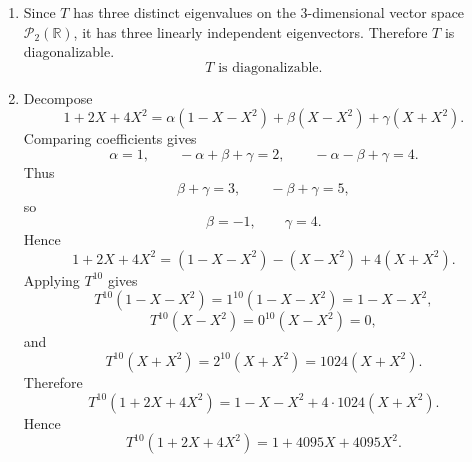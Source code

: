 \documentclass[12pt]{article}
\newcommand{\R}{\mathbb{R}}
\newcommand{\cP}{\mathcal{P}}
\begin{document}
\begin{enumerate}[label=(\alph*)]
  \item Since $T$ has three distinct eigenvalues on the $3$-dimensional vector space $\cP_2(\R)$, it has three linearly independent eigenvectors. Therefore $T$ is diagonalizable.
  \[
    \boxed{T\text{ is diagonalizable}.}
  \]

  \item Decompose
  \[
    1+2X+4X^2
    =\alpha(1-X-X^2)+\beta(X-X^2)+\gamma(X+X^2).
  \]
  Comparing coefficients gives
  \[
    \alpha=1,
    \qquad
    -\alpha+\beta+\gamma=2,
    \qquad
    -\alpha-\beta+\gamma=4.
  \]
  Thus
  \[
    \beta+\gamma=3,
    \qquad
    -\beta+\gamma=5,
  \]
  so
  \[
    \beta=-1,
    \qquad
    \gamma=4.
  \]
  Hence
  \[
    1+2X+4X^2=(1-X-X^2)-(X-X^2)+4(X+X^2).
  \]
  Applying $T^{10}$ gives
  \[
    T^{10}(1-X-X^2)=1^{10}(1-X-X^2)=1-X-X^2,
  \]
  \[
    T^{10}(X-X^2)=0^{10}(X-X^2)=0,
  \]
  and
  \[
    T^{10}(X+X^2)=2^{10}(X+X^2)=1024(X+X^2).
  \]
  Therefore
  \[
    T^{10}(1+2X+4X^2)
    =1-X-X^2+4\cdot 1024(X+X^2).
  \]
  Hence
  \[
    \boxed{T^{10}(1+2X+4X^2)=1+4095X+4095X^2.}
  \]
\end{enumerate}

\newpage
\end{document}
